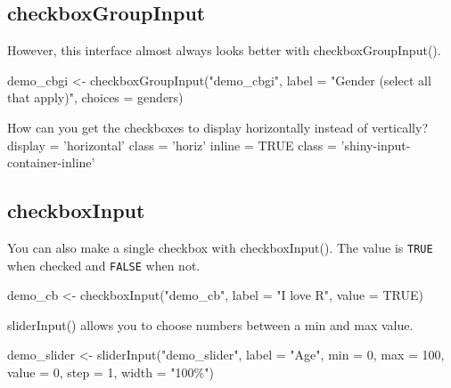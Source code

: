 \documentclass[
]{book}
\newenvironment{Shaded}{\begin{snugshade}}{\end{snugshade}}
\newcommand{\AttributeTok}[1]{\textcolor[rgb]{0.77,0.63,0.00}{#1}}
\newcommand{\ConstantTok}[1]{\textcolor[rgb]{0.00,0.00,0.00}{#1}}
\newcommand{\DecValTok}[1]{\textcolor[rgb]{0.00,0.00,0.81}{#1}}
\newcommand{\FunctionTok}[1]{\textcolor[rgb]{0.00,0.00,0.00}{#1}}
\newcommand{\NormalTok}[1]{#1}
\newcommand{\OtherTok}[1]{\textcolor[rgb]{0.56,0.35,0.01}{#1}}
\newcommand{\StringTok}[1]{\textcolor[rgb]{0.31,0.60,0.02}{#1}}
\begin{document}
\hypertarget{checkboxgroupinput}{%
\subsection{checkboxGroupInput}\label{checkboxgroupinput}}

However, this interface almost always looks better with checkboxGroupInput().

\begin{Shaded}
\begin{Highlighting}[]
\NormalTok{demo\_cbgi }\OtherTok{\textless{}{-}}
  \FunctionTok{checkboxGroupInput}\NormalTok{(}\StringTok{"demo\_cbgi"}\NormalTok{,}
                     \AttributeTok{label =} \StringTok{"Gender (select all that apply)"}\NormalTok{,}
                     \AttributeTok{choices =}\NormalTok{ genders)}
\end{Highlighting}
\end{Shaded}

How can you get the checkboxes to display horizontally instead of vertically?\\
display = 'horizontal' class = 'horiz' inline = TRUE class = 'shiny-input-container-inline'

\hypertarget{checkboxinput}{%
\subsection{checkboxInput}\label{checkboxinput}}

You can also make a single checkbox with checkboxInput(). The value is \texttt{TRUE} when checked and \texttt{FALSE} when not.

\begin{Shaded}
\begin{Highlighting}[]
\NormalTok{demo\_cb }\OtherTok{\textless{}{-}} \FunctionTok{checkboxInput}\NormalTok{(}\StringTok{"demo\_cb"}\NormalTok{,}
                         \AttributeTok{label =} \StringTok{"I love R"}\NormalTok{,}
                         \AttributeTok{value =} \ConstantTok{TRUE}\NormalTok{)}
\end{Highlighting}
\end{Shaded}

sliderInput() allows you to choose numbers between a min and max value.

\begin{Shaded}
\begin{Highlighting}[]
\NormalTok{demo\_slider }\OtherTok{\textless{}{-}} \FunctionTok{sliderInput}\NormalTok{(}\StringTok{"demo\_slider"}\NormalTok{,}
                           \AttributeTok{label =} \StringTok{"Age"}\NormalTok{,}
                           \AttributeTok{min =} \DecValTok{0}\NormalTok{,}
                           \AttributeTok{max =} \DecValTok{100}\NormalTok{,}
                           \AttributeTok{value =} \DecValTok{0}\NormalTok{,}
                           \AttributeTok{step =} \DecValTok{1}\NormalTok{,}
                           \AttributeTok{width =} \StringTok{"100\%"}\NormalTok{)}
\end{Highlighting}
\end{Shaded}
\end{document}
